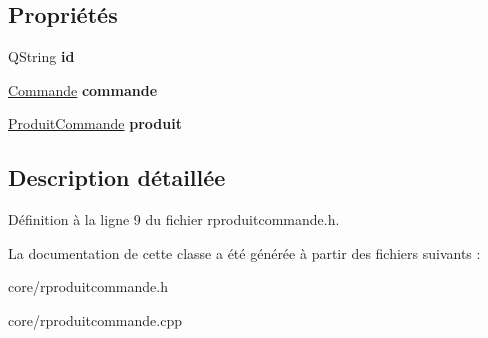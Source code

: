 \subsection*{Propriétés}
\begin{DoxyCompactItemize}
\item 
\hypertarget{class_core_1_1_r_produit_commande_a6b94e74d9e458754516f549dcbfbcf8a}{
QString {\bfseries id}}
\label{d3/dad/class_core_1_1_r_produit_commande_a6b94e74d9e458754516f549dcbfbcf8a}

\item 
\hypertarget{class_core_1_1_r_produit_commande_afacfd78cc1baa69c78b150485e5bb92a}{
\hyperlink{class_core_1_1_commande}{Commande} {\bfseries commande}}
\label{d3/dad/class_core_1_1_r_produit_commande_afacfd78cc1baa69c78b150485e5bb92a}

\item 
\hypertarget{class_core_1_1_r_produit_commande_a2480c7e336c78bbc46bc9bb2813abcff}{
\hyperlink{class_core_1_1_produit_commande}{ProduitCommande} {\bfseries produit}}
\label{d3/dad/class_core_1_1_r_produit_commande_a2480c7e336c78bbc46bc9bb2813abcff}

\end{DoxyCompactItemize}


\subsection{Description détaillée}


Définition à la ligne 9 du fichier rproduitcommande.h.



La documentation de cette classe a été générée à partir des fichiers suivants :\begin{DoxyCompactItemize}
\item 
core/rproduitcommande.h\item 
core/rproduitcommande.cpp\end{DoxyCompactItemize}
